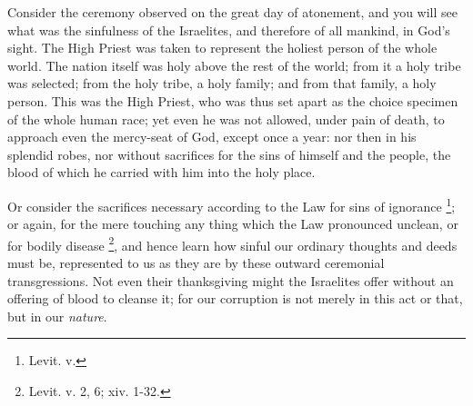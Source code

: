 Consider the ceremony observed on the great day of
atonement, and you will see what was the sinfulness of
the Israelites, and therefore of all mankind, in God's
sight. The High Priest was taken to represent the holiest
person of the whole world. The nation itself was holy
above the rest of the world; from it a holy tribe was
selected; from the holy tribe, a holy family; and from
that family, a holy person. This was the High Priest, who
was thus set apart as the choice specimen of the whole
human race; yet even he was not allowed, under pain of
death, to approach even the mercy-seat of God, except
once a year: nor then in his splendid robes, nor without
sacrifices for the sins of himself and the people, the
blood of which he carried with him into the holy place.

Or consider the sacrifices necessary according to the Law for sins of ignorance
\footnote{Levit. v.}; or again, for the
mere touching any thing which the Law pronounced unclean,
or for bodily disease \footnote{Levit. v. 2, 6; xiv. 1-32.}, and
hence learn how sinful our ordinary thoughts and deeds
must be, represented to us as they are by these outward
ceremonial transgressions. Not even their thanksgiving
might the Israelites offer without an offering of blood
to cleanse it; for our corruption is not merely in this
act or that, but in our \emph{nature}.

